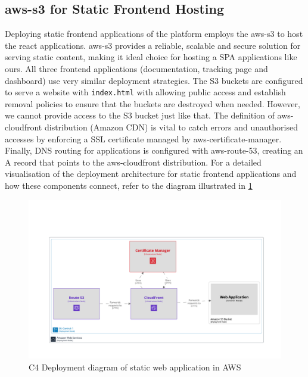 \subsection{\gls{aws-s3} for Static Frontend Hosting}
\label{subsec:amazon-s3-static-frontend}
Deploying static frontend applications of the platform employs the \gls{aws-s3} to host the \gls{react} applications. \gls{aws-s3} provides a reliable, scalable and secure solution for serving static content, making it ideal choice for hosting a \ac{SPA} applications like ours.
All three frontend applications (documentation, tracking page and dashboard) use very similar deployment strategies.
The \ac{S3} buckets are configured to serve a website with \texttt{index.html} with allowing public access and establish removal policies to ensure that the buckets are destroyed when needed. 
However, we cannot provide access to the \ac{S3} bucket just like that.
The definition of \gls{aws-cloudfront} distribution (Amazon \ac{CDN}) is vital to catch errors and unauthorised accesses by enforcing a \ac{SSL} certificate managed by \gls{aws-certificate-manager}.
Finally, \ac{DNS} routing for applications is configured with \gls{aws-route-53}, creating an A record that points to the \gls{aws-cloudfront} distribution.
For a detailed visualisation of the deployment architecture for static frontend applications and how these components connect, refer to the diagram illustrated in \ref{img06:fig_static-webapp} 


\begin{figure}[H]\centering
\includegraphics[width=140mm]{img/chap06/fig_static-webapp.png}
\caption{C4 Deployment diagram of static web application in AWS}
\label{img06:fig_static-webapp}
\end{figure}

